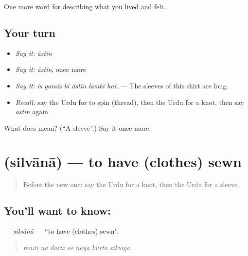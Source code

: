 \begin{grammarlens}[title={What you've built}]
One more word for describing what you lived and felt.
\end{grammarlens}

\subsection*{Your turn}
\begin{itemize}
\raggedright
  \item \emph{Say it:} \emph{āstīn}
  \item \emph{Say it:} \emph{āstīn}, once more
  \item \emph{Say it:} \emph{is qamīz kī āstīn lambī hai.} — The sleeves of this shirt are long.
  \item \emph{Recall:} say the Urdu for to spin (thread), then the Urdu for a knot, then say \emph{āstīn} again
\end{itemize}

\begin{tcolorbox}[breakable,colback=teal!4,colframe=teal!35!black,title={Before you move on}]
What does  mean? (\textquotedblleft{}A sleeve\textquotedblright{}.) Say it once more.
\end{tcolorbox}
\section[\texorpdfstring{\ur{سلوانا} (silvānā)}{سلوانا (silvānā)}]{ (silvānā) — to have (clothes) sewn}

\label{lesson:UR-C500-silvana}



\begin{quote}
Before the new one: say the Urdu for a knot, then the Urdu for a sleeve.
\end{quote}

\subsection*{You'll want to know: }
\textbf{} — \emph{silvānā} — \textquotedblleft{}to have (clothes) sewn\textquotedblright{}.

\begin{quote}
      
\end{quote}

\begin{quote}
\emph{maiṅ ne darzī se nayā kurtā silvāyā.}
\end{quote}

